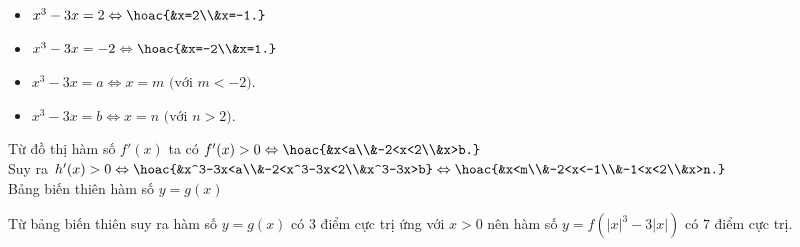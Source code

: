 \begin{ex}
{\begin{itemize}
            \item $x^3-3x=2\Leftrightarrow \hoac{&x=2\\&x=-1.}$
            \item $x^3-3x=-2\Leftrightarrow \hoac{&x=-2\\&x=1.}$
            \item $x^3-3x=a\Leftrightarrow x=m \text{ (với $m<-2$)}$.
            \item $x^3-3x=b\Leftrightarrow x=n \text{ (với $n>2$)}$.
        \end{itemize}
        Từ đồ thị hàm số $f'(x)$ ta có $f'(x)>0\Leftrightarrow \hoac{&x<a\\&-2<x<2\\&x>b.}$\\
        Suy ra $h'(x)>0\Leftrightarrow \hoac{&x^3-3x<a\\&-2<x^3-3x<2\\&x^3-3x>b}\Leftrightarrow \hoac{&x<m\\&-2<x<-1\\&-1<x<2\\&x>n.}$\\
        Bảng biến thiên hàm số $y=g(x)$
        \begin{center}
        \end{center}
        Từ bảng biến thiên suy ra hàm số $y=g(x)$ có $3$ điểm cực trị ứng với $x>0$ nên hàm số $y=f(|x|^3-3|x|)$ có $7$ điểm cực trị.

    }
\end{ex}
